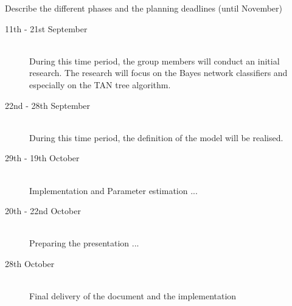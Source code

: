 \documentclass[a4paper, 11pt]{scrartcl}
\begin{document}
Describe the different phases and the planning deadlines (until November)

\begin{description}
	\item[11th - 21st September]\-\\
	During this time period, the group members will conduct an initial research. The research will focus on the Bayes network classifiers and especially on the TAN tree algorithm.
	\item[22nd - 28th September]\-\\
	During this time period, the definition of the model will be realised. \cite{CV:2009kl}
	\item[29th - 19th October]\-\\
	Implementation and Parameter estimation ...
	\item[20th - 22nd October]\-\\
	Preparing the presentation ...
	\item[28th October]\-\\
	Final delivery of the document and the implementation
\end{description}

\nocite{*} %


\end{document}
